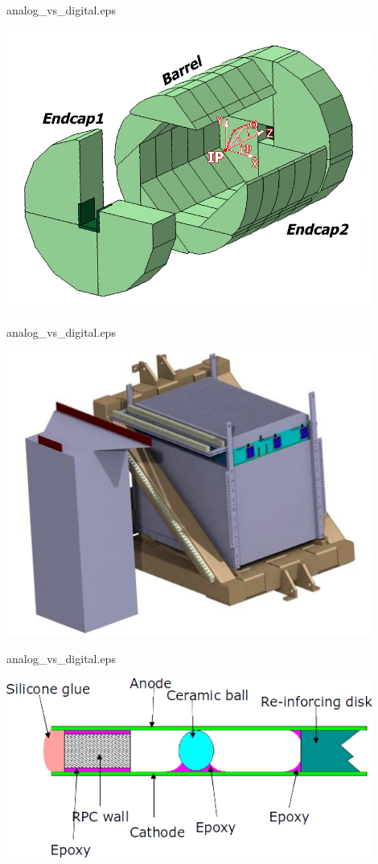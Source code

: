 
\begin{frame}{analog\_vs\_digital.eps}
  \centerline{\includegraphics[width=0.9\textwidth]{images/IldDhcal}}
\end{frame}
\begin{frame}{analog\_vs\_digital.eps}
  \centerline{\includegraphics[width=0.9\textwidth]{images/DHCALProtoSchema}}
\end{frame}
\begin{frame}{analog\_vs\_digital.eps}
  \centerline{\includegraphics[width=0.9\textwidth]{images/RPCSchema}}
\end{frame}

